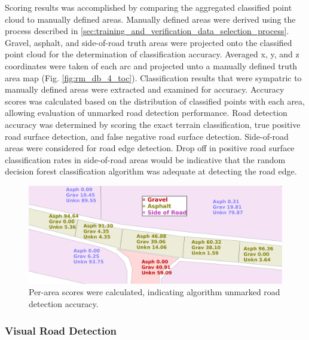 \documentclass[numbered,pdftex]{ohio-etd}
\begin{document}
{{{{{				{Scoring results was accomplished by comparing the aggregated classified point cloud to manually defined areas. Manually defined areas were derived using the process described in \ref{sec:training_and_verification_data_selection_process}. Gravel, asphalt, and side-of-road truth areas were projected onto the classified point cloud for the determination of classification accuracy. Averaged x, y, and z coordinates were taken of each arc and projected unto a manually defined truth area map (Fig. \ref{fig:rm_db_4_toc}). Classification results that were sympatric to manually defined areas were extracted and examined for accuracy. Accuracy scores was calculated based on the distribution of classified points with each area, allowing evaluation of unmarked road detection performance. Road detection accuracy was determined by scoring the exact terrain classification, true positive road surface detection, and false negative road surface detection. Side-of-road areas were considered for road edge detection. Drop off in positive road surface classification rates in side-of-road areas would be indicative that the random decision forest classification algorithm was adequate at detecting the road edge.}
				
				
				
				
				\begin{figure}[H]
					\centering
					\includegraphics[width=0.75\linewidth]{Defense_Images/rm_db_1_area_score}
					\caption[Area Scores]{Per-area scores were calculated, indicating algorithm unmarked road detection accuracy. }
					\label{fig:prepostadjust}
				\end{figure}
				
				
				
			}
		
			\subsubsection{Visual Road Detection}\label{sec:manual_road_detection}{
			
}}}}}
\end{document}
